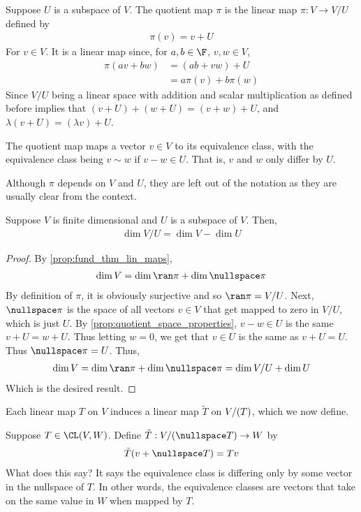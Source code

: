 \documentclass{article}
\begin{document}
  \begin{defn}
    Suppose $U$ is a subspace of $V$. The quotient map $\pi$ is the linear map $\pi: V \to V/U$ defined by
    \begin{align*}
      \pi(v) = v + U
    \end{align*}
    For $v \in V$. It is a linear map since, for $a, b \in \F$, $v, w \in V$, 
    \begin{align*}
      \pi(av + bw) & = (ab + vw) + U \\
      & = a\pi(v) + b\pi(w)
    \end{align*}
    Since $V/U$ being a linear space with addition and scalar multiplication as defined before implies that $(v + U) + (w + U) = (v + w) + U$, and $\lambda(v + U) = (\lambda v) + U$.

    The quotient map maps a vector $v \in V$ to its equivalence class, with the equivalence class being $v \sim w$ if $v - w \in U$. That is, $v$ and $w$ only differ by $U$.
  \end{defn}
  Although $\pi$ depends on $V$ and $U$, they are left out of the notation as they are usually clear from the context.
  \begin{prop}
    Suppose $V$ is finite dimensional and $U$ is a subspace of $V$. Then,
    \begin{align*}
      \dim V/U = \dim V - \dim U
    \end{align*}
  \end{prop}
  \begin{proof}
    By \eqref{prop:fund_thm_lin_maps}, 
    \begin{align*}
      \dim V = \dim\ran\pi + \dim\nullspace\pi
    \end{align*}
    By definition of $\pi$, it is obviously surjective and so $\ran\pi = V/U$. Next, $\nullspace\pi$ is the space of all vectors $v \in V$ that get mapped to zero in $V/U$, which is just $U$.
    By \eqref{prop:quotient_space_properties}, $v - w \in U$ is the same $v + U = w + U$. Thus letting $w = 0$, we get that $v \in U$ is the same as $v + U = U$. Thus $\nullspace\pi = U$. Thus,
    \begin{align*}
      \dim V = \dim\ran\pi + \dim\nullspace\pi = \dim V/U + \dim U
    \end{align*}
    Which is the desired result.
  \end{proof}
  Each linear map $T$ on $V$ induces a linear map $\tilde{T}$ on $V/(\null T)$, which we now define.
  \begin{defn}[$\tilde{T}$]
    Suppose $T \in \CL(V, W)$. Define $\tilde{T}: V/(\nullspace T) \to W$ by
    \begin{align*}
      \tilde{T}(v + \nullspace T) = Tv
    \end{align*}
    What does this say? It says the equivalence class is differing only by some vector in the nullspace of $T$. In other words, the equivalence classes are vectors that take on the same
    value in $W$ when mapped by $T$.
  \end{defn}
\end{document}
